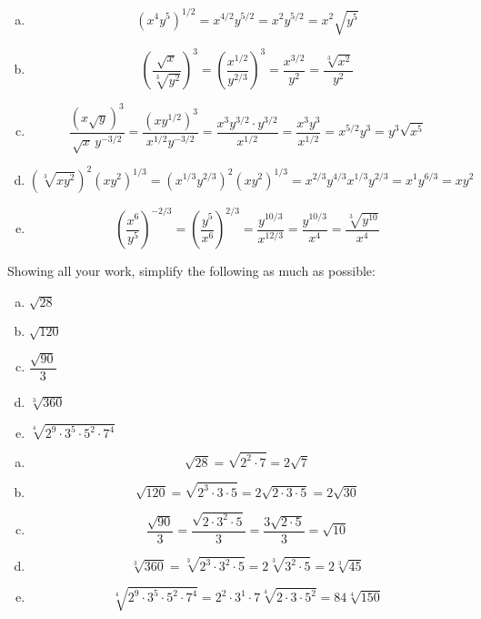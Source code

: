\documentclass[11pt,letterpaper]{article}
\begin{document}
\sol
\begin{enumerate}[(a)]
\item 
	\[
	(x^4 y^5)^{1/2}= x^{4/2} y^{5/2}= x^2 y^{5/2}= x^2 \sqrt{y^5}
	\] \pspace

\item 
	\[
	\left( \dfrac{\sqrt{x}}{\sqrt[3]{y^2}} \right)^3= \left( \dfrac{x^{1/2}}{y^{2/3}} \right)^3= \dfrac{x^{3/2}}{y^2}= \dfrac{\sqrt[3]{x^2}}{y^2}
	\] \pspace

\item 
	\[
	\dfrac{(x \sqrt{y})^{3}}{\sqrt{x}\, y^{-3/2}}= \dfrac{(x y^{1/2})^{3}}{x^{1/2} y^{-3/2}}= \dfrac{x^3 y^{3/2} \cdot y^{3/2}}{x^{1/2}}= \dfrac{x^3 y^3}{x^{1/2}}= x^{5/2} y^3= y^3 \sqrt{x^5}
	\] \pspace

\item 
	\[
	(\sqrt[3]{x y^2})^2 (xy^2)^{1/3}= (x^{1/3} y^{2/3})^2 (xy^2)^{1/3}= x^{2/3} y^{4/3} x^{1/3} y^{2/3}= x^1 y^{6/3}= xy^2
	\] \pspace

\item 
	\[
	\left( \dfrac{x^6}{y^5} \right)^{-2/3}= \left( \dfrac{y^5}{x^6} \right)^{2/3}= \dfrac{y^{10/3}}{x^{12/3}}= \dfrac{y^{10/3}}{x^4}= \dfrac{\sqrt[3]{y^{10}}}{x^4}
	\] 
\end{enumerate}



\newpage



 Showing all your work, simplify the following as much as possible:
\begin{enumerate}[(a)]
\item $\sqrt{28}$
\item $\sqrt{120}$
\item $\dfrac{\sqrt{90}}{3}$
\item $\sqrt[3]{360}$
\item $\sqrt[4]{2^9 \cdot 3^5 \cdot 5^2 \cdot 7^4}$
\end{enumerate} \pspace

\sol
\begin{enumerate}[(a)]
\item 
	\[
	\sqrt{28}= \sqrt{2^2 \cdot 7}= 2 \sqrt{7}
	\] \pspace

\item 
	\[
	\sqrt{120}= \sqrt{2^3 \cdot 3 \cdot 5}= 2 \sqrt{2 \cdot 3 \cdot 5}= 2\sqrt{30}
	\] \pspace

\item 
	\[
	\dfrac{\sqrt{90}}{3}= \dfrac{\sqrt{2 \cdot 3^2 \cdot 5}}{3}= \dfrac{3 \sqrt{2 \cdot 5}}{3}= \sqrt{10}
	\] \pspace

\item 
	\[
	\sqrt[3]{360}= \sqrt[3]{2^3 \cdot 3^2 \cdot 5}= 2 \sqrt[3]{3^2 \cdot 5}= 2 \sqrt[3]{45}
	\] \pspace

\item 
	\[
	\sqrt[4]{2^9 \cdot 3^5 \cdot 5^2 \cdot 7^4}= 2^2 \cdot 3^1 \cdot 7 \sqrt[4]{2 \cdot 3 \cdot 5^2}= 84 \sqrt[4]{150}
	\]
\end{enumerate}
\end{document}

